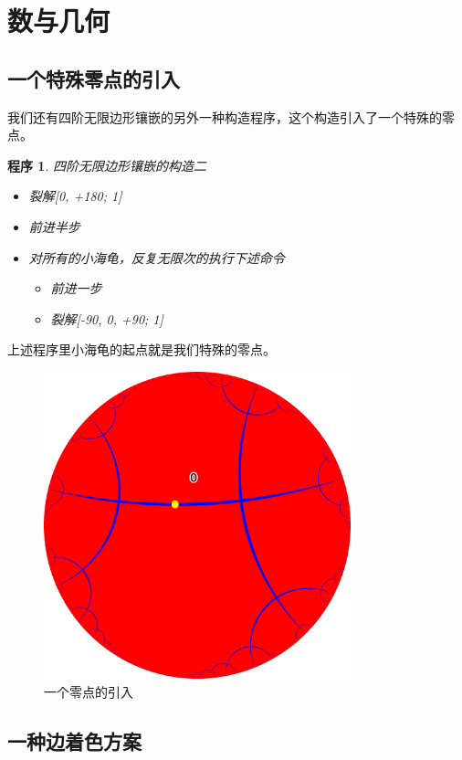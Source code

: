 \documentclass[a4paper,12pt]{article}
\newtheorem{program}{程序}
\begin{document}
\newpage

\section{数与几何}

\subsection{一个特殊零点的引入}

我们还有四阶无限边形镶嵌的另外一种构造程序，这个构造引入了一个特殊的零点。

\begin{program}
四阶无限边形镶嵌的构造二
\begin{itemize}
\item 裂解[0, +180; 1]
\item 前进半步
\item 对所有的小海龟，反复无限次的执行下述命令
\begin{itemize}
  \item 前进一步
  \item 裂解[-90, 0, +90; 1]
\end{itemize}
\end{itemize}
\end{program}

上述程序里小海龟的起点就是我们特殊的零点。

\begin{figure}[ht]
\centering
\includegraphics[width=3.5in]{images/H2_tiling_with_zero.png}
\caption{一个零点的引入}
\end{figure}

\subsection{一种边着色方案}
\end{document}
